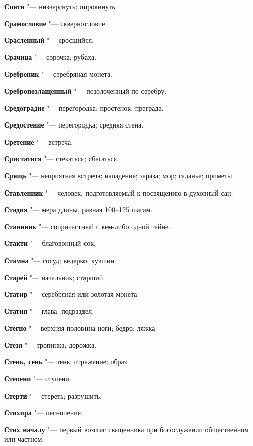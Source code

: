 \begin{mymulticols}
\noindent\textbf{Спяти} "--- низвергнуть; опрокинуть 

\noindent\textbf{Срамословие} "--- сквернословие. 

\noindent\textbf{Срасленный} "--- сросшийся. 

\noindent\textbf{Срачица} "--- сорочка; рубаха. 

\noindent\textbf{Сребреник} "--- серебряная монета. 

\noindent\textbf{Сребропозлащенный} "--- позолоченный по серебру. 

\noindent\textbf{Средоградие} "--- перегородка; простенок; преграда. 

\noindent\textbf{Средостение} "--- перегородка; средняя стена. 

\noindent\textbf{Сретение} "--- встреча. 

\noindent\textbf{Сристатися} "--- стекаться; сбегаться. 

\noindent\textbf{Срящь} "--- неприятная встреча; нападение; зараза; мор; гаданье; приметы. 

\noindent\textbf{Ставленник} "--- человек, подготовляемый к посвящению в духовный сан. 

\noindent\textbf{Стадия} "--- мера длины, равная 100--125 шагам. 

\noindent\textbf{Стаинник} "--- сопричастный с кем-либо одной тайне. 

\noindent\textbf{Стакти} "--- благовонный сок. 

\noindent\textbf{Стамна} "--- сосуд; ведерко; кувшин. 

\noindent\textbf{Старей} "--- начальник; старший. 

\noindent\textbf{Статир} "--- серебряная или золотая монета. 

\noindent\textbf{Статия} "--- глава; подраздел. 

\noindent\textbf{Стегно} "--- верхняя половина ноги; бедро; ляжка. 

\noindent\textbf{Стезя} "--- тропинка; дорожка. 

\noindent\textbf{Стень, сень} "--- тень; отражение; образ. 

\noindent\textbf{Степени} "--- ступени. 

\noindent\textbf{Стерти} "--- стереть; разрушить. 

\noindent\textbf{Стихира} "--- песнопение. 

\noindent\textbf{Стих началу} "--- первый возглас священника при богослужении общественном или частном. 


\end{mymulticols}
